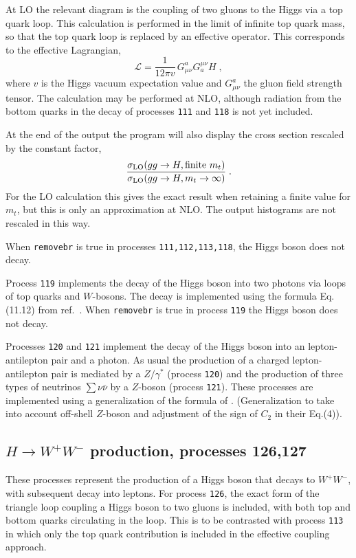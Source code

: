\documentclass[12pt]{article}
\begin{document}
At LO the relevant diagram
is the coupling of two gluons to the Higgs via a top quark loop.
This calculation is performed in the limit of infinite top quark mass, so that 
the top quark loop is replaced by an effective operator. This corresponds
to the effective Lagrangian,
\begin{equation}
\mathcal{L} = \frac{1}{12\pi v} \, G^a_{\mu\nu} G^{\mu\nu}_a H \;,
\label{eq:HeffL}
\end{equation}
where $v$ is the Higgs vacuum expectation value and $G^a_{\mu\nu}$ the
gluon field strength tensor.
The calculation may be performed at NLO, although radiation from the
bottom quarks in the decay of processes {\tt 111} and {\tt 118} is not yet included.

At the end of the output the program will also display the cross section rescaled
by the constant factor,
\begin{equation}
\frac{\sigma_{\rm LO}(gg \to H, \mbox{finite}~m_t)}{\sigma_{\rm LO}(gg \to H, m_t \to \infty)} \;.
\label{eqn:hrescale}
\end{equation}
For the LO calculation this gives the exact result when retaining a finite value for $m_t$,
but this is only an approximation at NLO. The output histograms are not rescaled in this way.

When {\tt removebr} is true in processes {\tt 111,112,113,118},
the Higgs boson does not decay.

Process {\tt 119} implements the decay of the Higgs boson into two photons
via loops of top quarks and $W$-bosons.
The decay is implemented using the formula Eq.(11.12) from ref.~\cite{Ellis:1991qj}.
When {\tt removebr} is true in process {\tt 119} the Higgs boson does not decay.

Processes {\tt 120} and {\tt 121} implement the decay of the Higgs boson into an lepton-antilepton
pair and a photon. As usual the production of a charged lepton-antilepton pair is mediated by a 
$Z/\gamma^*$ (process {\tt 120}) and the production of three types of neutrinos 
$\sum  \nu \bar{\nu}$ by a $Z$-boson (process {\tt 121}). These processes are implemented 
using a generalization of the formula of \cite{Djouadi:1996yq}. (Generalization to take into
account off-shell $Z$-boson and adjustment of the sign of $C_2$ in their Eq.(4)).


\subsection{$H \to W^+W^-$ production, processes 126,127}
These processes represent the production of a Higgs boson that decays to $W^+ W^-$,
with subsequent decay into leptons. For process {\tt 126}, the exact form of the triangle
loop coupling a Higgs boson to two gluons is included, with both top and bottom quarks
circulating in the loop. This is to be contrasted with process {\tt 113} in which only the
top quark contribution is included in the effective coupling approach.
\end{document}
